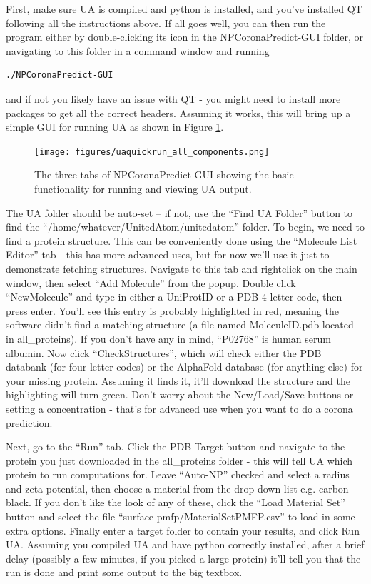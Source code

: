 \documentclass[10pt,a4paper,onecolumn]{report}
\begin{document}
First, make sure UA is compiled and python is installed, and you've installed QT following all the instructions above.  If all goes well, you can then run the program either by double-clicking its icon in the NPCoronaPredict-GUI folder, or navigating to this folder in a command window and running
\begin{lstlisting}
./NPCoronaPredict-GUI
\end{lstlisting}
and if not you likely have an issue with QT - you might need to install more packages to get all the correct headers. Assuming it works, this will bring up a simple GUI for running UA as shown in Figure \ref{fig:uaquickrun_screen}.

\begin{figure} \label{fig:uaquickrun_screen}
    \centering
    \texttt{[image: figures/uaquickrun\_all\_components.png]}
    \caption{The three tabs of NPCoronaPredict-GUI showing the basic functionality for running and viewing UA output.  }
\end{figure}

 The UA folder should be auto-set  -- if not, use the ``Find UA Folder'' button to find the ``/home/whatever/UnitedAtom/unitedatom'' folder. To begin, we need to find a protein structure. This can be conveniently done using the ``Molecule List Editor'' tab - this has more advanced uses, but for now we'll use it just to demonstrate fetching structures. Navigate to this tab and rightclick on the main window, then select ``Add Molecule'' from the popup. Double click ``NewMolecule'' and type in either a UniProtID or a PDB 4-letter code, then press enter. You'll see this entry is probably highlighted in red, meaning the software didn't find a matching structure (a file named MoleculeID.pdb located in all\_proteins). If you don't have any in mind, ``P02768'' is human serum albumin.  Now click ``CheckStructures'', which will check either the PDB databank (for four letter codes) or the AlphaFold database (for anything else) for your missing protein. Assuming it finds it, it'll download the structure and the highlighting will turn green. Don't worry about the New/Load/Save buttons or setting a concentration - that's for advanced use when you want to do a corona prediction.
 
Next, go to the ``Run'' tab. Click the PDB Target button and navigate to the protein you just downloaded in the all\_proteins folder - this will tell UA which protein to run computations for. Leave ``Auto-NP'' checked and select a radius and zeta potential, then choose a material from the drop-down list e.g. carbon black. If you don't like the look of any of these, click the ``Load Material Set'' button and select the file ``surface-pmfp/MaterialSetPMFP.csv'' to load in some extra options.  Finally enter a target folder to contain your results, and click Run UA. Assuming you compiled UA and have python correctly installed, after a brief delay (possibly a few minutes, if you picked a large protein) it'll tell you that the run is done and print some output to the big textbox.
\end{document}
